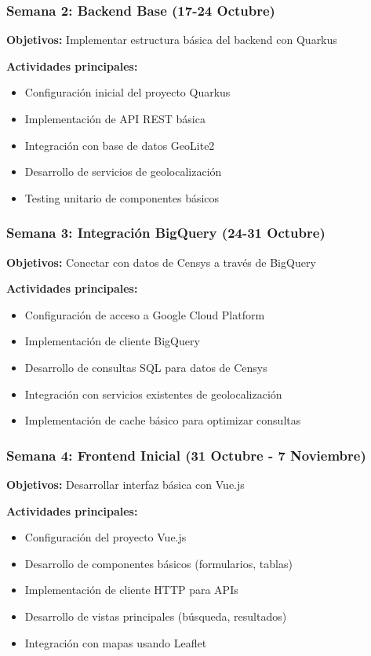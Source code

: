 \subsubsection{Semana 2: Backend Base (17-24 Octubre)}
\textbf{Objetivos:} Implementar estructura básica del backend con Quarkus

\textbf{Actividades principales:}
\begin{itemize}
    \item Configuración inicial del proyecto Quarkus
    \item Implementación de API REST básica
    \item Integración con base de datos GeoLite2
    \item Desarrollo de servicios de geolocalización
    \item Testing unitario de componentes básicos
\end{itemize}

\subsubsection{Semana 3: Integración BigQuery (24-31 Octubre)}
\textbf{Objetivos:} Conectar con datos de Censys a través de BigQuery

\textbf{Actividades principales:}
\begin{itemize}
    \item Configuración de acceso a Google Cloud Platform
    \item Implementación de cliente BigQuery
    \item Desarrollo de consultas SQL para datos de Censys
    \item Integración con servicios existentes de geolocalización
    \item Implementación de cache básico para optimizar consultas
\end{itemize}

\subsubsection{Semana 4: Frontend Inicial (31 Octubre - 7 Noviembre)}
\textbf{Objetivos:} Desarrollar interfaz básica con Vue.js

\textbf{Actividades principales:}
\begin{itemize}
    \item Configuración del proyecto Vue.js
    \item Desarrollo de componentes básicos (formularios, tablas)
    \item Implementación de cliente HTTP para APIs
    \item Desarrollo de vistas principales (búsqueda, resultados)
    \item Integración con mapas usando Leaflet
\end{itemize}

